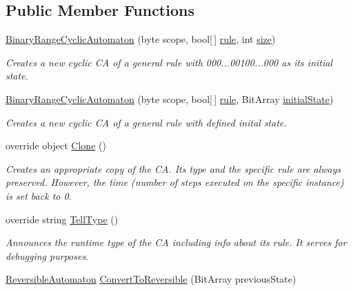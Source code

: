 \subsection*{Public Member Functions}
\begin{DoxyCompactItemize}
\item 
\hyperlink{class_cellular_1_1_binary_range_cyclic_automaton_a9f47b4027eba7db4a959946967ba371e}{Binary\+Range\+Cyclic\+Automaton} (byte scope, bool\mbox{[}$\,$\mbox{]} \hyperlink{class_cellular_1_1_binary_range_automaton_a4dda99c3151599c8ef12d08d7472144c}{rule}, int \hyperlink{class_cellular_1_1_automaton1_d_a915129ccf0f1e7092844c99ce6a28e5b}{size})
\begin{DoxyCompactList}\small\item\em Creates a new cyclic C\+A of a general rule with 000...00100...000 as its initial state. \end{DoxyCompactList}\item 
\hyperlink{class_cellular_1_1_binary_range_cyclic_automaton_a541a8c6eff23ec8afddc7388158df80e}{Binary\+Range\+Cyclic\+Automaton} (byte scope, bool\mbox{[}$\,$\mbox{]} \hyperlink{class_cellular_1_1_binary_range_automaton_a4dda99c3151599c8ef12d08d7472144c}{rule}, Bit\+Array \hyperlink{all__1_8js_ae8b87ff4be2ae1dd5267342795263360}{initial\+State})
\begin{DoxyCompactList}\small\item\em Creates a new cyclic C\+A of a general rule with defined inital state. \end{DoxyCompactList}\item 
override object \hyperlink{class_cellular_1_1_binary_range_cyclic_automaton_a2361fe82802e372b24b8bec6a6135278}{Clone} ()
\begin{DoxyCompactList}\small\item\em Creates an appropriate copy of the C\+A. Its type and the specific rule are always preserved. However, the time (number of steps executed on the specific instance) is set back to 0. \end{DoxyCompactList}\item 
override string \hyperlink{class_cellular_1_1_binary_range_cyclic_automaton_a75754d1c54550e1f29a9282647947cb8}{Tell\+Type} ()
\begin{DoxyCompactList}\small\item\em Announces the runtime type of the C\+A including info about its rule. It serves for debugging purposes. \end{DoxyCompactList}\item 
\hyperlink{class_cellular_1_1_reversible_automaton}{Reversible\+Automaton} \hyperlink{class_cellular_1_1_binary_range_cyclic_automaton_a68dc88c2cb78aaaf6246ebf6f058fbb9}{Convert\+To\+Reversible} (Bit\+Array previous\+State)
\end{DoxyCompactItemize}
